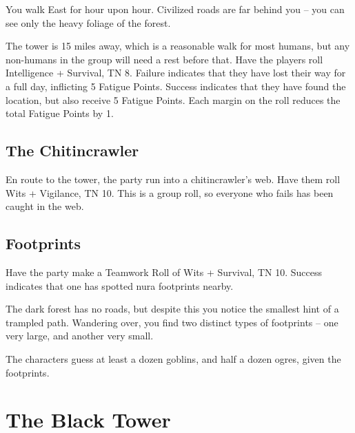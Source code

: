 \begin{multicols}{2}
\begin{boxtext}

	\noindent
	You walk East for hour upon hour.
	Civilized roads are far behind you -- you can see only the heavy foliage of the forest.

\end{boxtext}

\noindent
The tower is 15 miles away, which is a reasonable walk for most humans, but any non-humans in the group will need a rest before that.%
\iftoggle{core}{\footnote{See the core book, page \pageref{fatigue} for Fatigue rules.}}{}
Have the players roll Intelligence + Survival, TN 8.
Failure indicates that they have lost their way for a full day, inflicting 5 Fatigue Points.
Success indicates that they have found the location, but also receive 5 Fatigue Points.
Each margin on the roll reduces the total Fatigue Points by 1.

\subsection{The Chitincrawler}

En route to the tower, the party run into a chitincrawler's web.
Have them roll Wits + Vigilance, TN 10.
This is a group roll, so everyone who fails has been caught in the web.

\chitincrawler

\subsection{Footprints}

Have the party make a Teamwork Roll of Wits + Survival, TN 10.
Success indicates that one has spotted nura footprints nearby.

\begin{boxtext}

	The dark forest has no roads, but despite this you notice the smallest hint of a trampled path.
	Wandering over, you find two distinct types of footprints -- one very large, and another very small.

\end{boxtext}

The characters guess at least a dozen goblins, and half a dozen ogres, given the footprints.

\end{multicols}

\section{The Black Tower}

